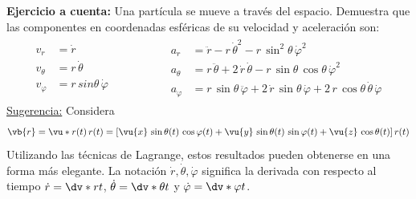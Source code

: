 \textbf{Ejercicio a cuenta:} Una partícula se mueve a través del espacio. Demuestra que las componentes en coordenadas esféricas de su velocidad y aceleración son:
\begin{align*}
\begin{aligned}
v_{r} &= \dot{r} \\
v_{\theta} &= r \, \dot{\theta} \\
v_{\varphi} &= r \, sin \theta \, \dot{\varphi}
\end{aligned}
\hspace{2cm}
\begin{aligned}
a_{r} &= \ddot{r} - r \, \dot{\theta}^{2} - r \, \sin^{2} \theta \, \dot{\varphi}^{2} \\
a_{\theta} &= r \, \ddot{\theta} + 2 \, \dot{r} \, \dot{\theta} - r \, \sin \theta \, \cos \theta \, \dot{\varphi}^{2} \\
a_{\varphi} &= r \, \sin \theta \, \ddot{\varphi} +  2 \, \dot{r} \, \sin \theta \, \dot{\varphi} + 2 \, r \, \cos \theta \, \dot{\theta} \, \dot{\varphi}
\end{aligned}
\end{align*}
\underline{Sugerencia:} Considera
\begin{align*}
\vb{r} = \vu*{r} (t) \, r(t) = [ \vu{x} \, \sin \theta (t)  \, \cos \varphi (t) + \vu{y} \, \sin \theta (t)  \, \sin \varphi (t) + \vu{z} \, \cos \theta (t) ] \, r(t)
\end{align*}
Utilizando las técnicas de Lagrange, estos resultados pueden obtenerse en una forma más elegante. La notación $\dot{r}, \dot{\theta}, \dot{\varphi}$ significa la derivada con respecto al tiempo $\dot{r} = \dv*{r}{t}$, $\dot{\theta} = \dv*{\theta}{t}$ y $\dot{\varphi} = \dv*{\varphi}{t}$.
